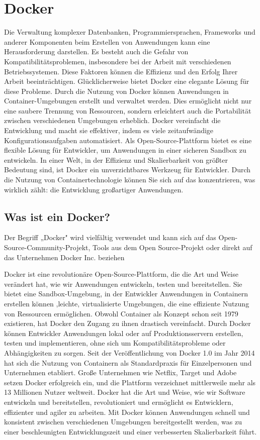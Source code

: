 \section{Docker}\label{Docker}

Die Verwaltung komplexer Datenbanken, Programmiersprachen, Frameworks und anderer Komponenten beim Erstellen von Anwendungen kann eine Herausforderung darstellen. Es besteht auch die Gefahr von Kompatibilitätsproblemen, insbesondere bei der Arbeit mit verschiedenen Betriebssystemen. Diese Faktoren können die Effizienz und den Erfolg Ihrer Arbeit beeinträchtigen.
Glücklicherweise bietet Docker eine elegante Lösung für diese Probleme. Durch die Nutzung von Docker können Anwendungen in Container-Umgebungen erstellt und verwaltet werden. Dies ermöglicht nicht nur eine saubere Trennung von Ressourcen, sondern erleichtert auch die Portabilität zwischen verschiedenen Umgebungen erheblich.
Docker vereinfacht die Entwicklung und macht sie effektiver, indem es viele zeitaufwändige Konfigurationsaufgaben automatisiert. Als Open-Source-Plattform bietet es eine flexible Lösung für Entwickler, um Anwendungen in einer sicheren Sandbox zu entwickeln.
In einer Welt, in der Effizienz und Skalierbarkeit von größter Bedeutung sind, ist Docker ein unverzichtbares Werkzeug für Entwickler. Durch die Nutzung von Containertechnologie können Sie sich auf das konzentrieren, was wirklich zählt: die Entwicklung großartiger Anwendungen.

\subsection{Was ist ein Docker?}

Der Begriff „Docker" wird vielfältig verwendet und kann sich auf das Open-Source-Community-Projekt, Tools aus dem Open Source-Projekt oder direkt auf das Unternehmen Docker Inc. beziehen

Docker ist eine revolutionäre Open-Source-Plattform, die die Art und Weise verändert hat, wie wir Anwendungen entwickeln, testen und bereitstellen. Sie bietet eine Sandbox-Umgebung, in der Entwickler Anwendungen in Containern erstellen können ,leichte, virtualisierte Umgebungen, die eine effiziente Nutzung von Ressourcen ermöglichen. 
Obwohl Container als Konzept schon seit 1979 existieren, hat Docker den Zugang zu ihnen drastisch vereinfacht. Durch Docker können Entwickler Anwendungen lokal oder auf Produktionsservern erstellen, testen und implementieren, ohne sich um Kompatibilitätsprobleme oder Abhängigkeiten zu sorgen.
Seit der Veröffentlichung von Docker 1.0 im Jahr 2014 hat sich die Nutzung von Containern als Standardpraxis für Einzelpersonen und Unternehmen etabliert. Große Unternehmen wie Netflix, Target und Adobe setzen Docker erfolgreich ein, und die Plattform verzeichnet mittlerweile mehr als 13 Millionen Nutzer weltweit. 
Docker hat die Art und Weise, wie wir Software entwickeln und bereitstellen, revolutioniert und ermöglicht es Entwicklern, effizienter und agiler zu arbeiten. Mit Docker können Anwendungen schnell und konsistent zwischen verschiedenen Umgebungen bereitgestellt werden, was zu einer beschleunigten Entwicklungszeit und einer verbesserten Skalierbarkeit führt. 

